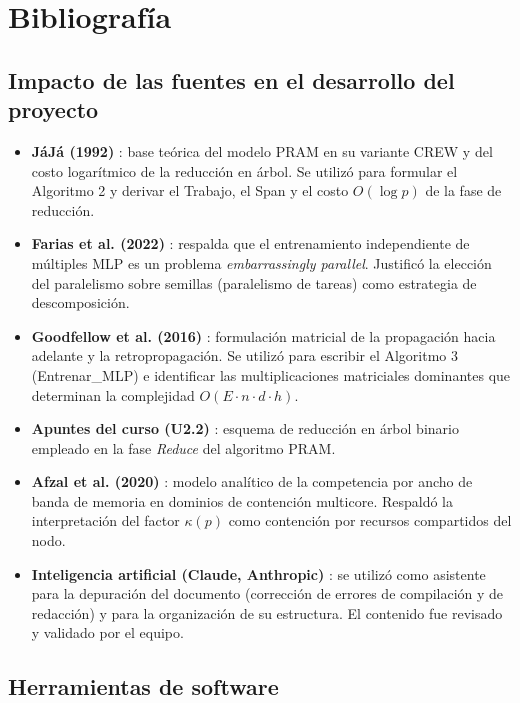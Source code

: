 \documentclass[11pt, a4paper]{article}
\begin{document}
\section{Bibliografía}

\subsection*{Impacto de las fuentes en el desarrollo del proyecto}

\begin{itemize}
    \item \textbf{JáJá (1992)} \cite{jaja1992parallel}: base teórica del modelo PRAM en su variante CREW y del costo logarítmico de la reducción en árbol. Se utilizó para formular el Algoritmo 2 y derivar el Trabajo, el Span y el costo $O(\log p)$ de la fase de reducción.
    \item \textbf{Farias et al. (2022)} \cite{farias2022parallelmlps}: respalda que el entrenamiento independiente de múltiples MLP es un problema \textit{embarrassingly parallel}. Justificó la elección del paralelismo sobre semillas (paralelismo de tareas) como estrategia de descomposición.
    \item \textbf{Goodfellow et al. (2016)} \cite{goodfellow2016deep}: formulación matricial de la propagación hacia adelante y la retropropagación. Se utilizó para escribir el Algoritmo 3 (Entrenar\_MLP) e identificar las multiplicaciones matriciales dominantes que determinan la complejidad $O(E \cdot n \cdot d \cdot h)$.
    \item \textbf{Apuntes del curso (U2.2)} \cite{u2.2}: esquema de reducción en árbol binario empleado en la fase \textit{Reduce} del algoritmo PRAM.
    \item \textbf{Afzal et al. (2020)} \cite{afzal2020bandwidth}: modelo analítico de la competencia por ancho de banda de memoria en dominios de contención multicore. Respaldó la interpretación del factor $\kappa(p)$ como contención por recursos compartidos del nodo.
    \item \textbf{Inteligencia artificial (Claude, Anthropic)} \cite{claude}: se utilizó como asistente para la depuración del documento (corrección de errores de compilación y de redacción) y para la organización de su estructura. El contenido fue revisado y validado por el equipo.
\end{itemize}

\subsection*{Herramientas de software}
\end{document}
